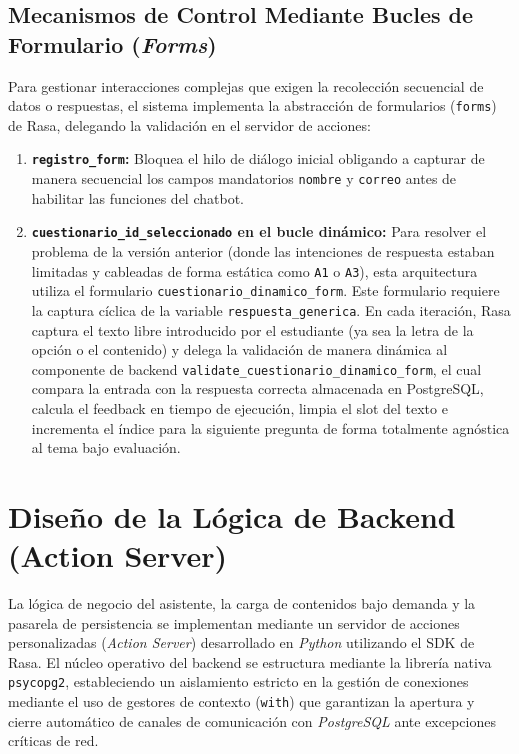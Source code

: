 \documentclass[a4paper,12pt,twoside,final]{book}
\begin{document}
\subsection{Mecanismos de Control Mediante Bucles de Formulario (\textit{Forms})}
Para gestionar interacciones complejas que exigen la recolección secuencial de datos o respuestas, el sistema implementa la abstracción de formularios (\texttt{forms}) de Rasa, delegando la validación en el servidor de acciones:
\begin{enumerate}
    \item \textbf{\texttt{registro\_form}:} Bloquea el hilo de diálogo inicial obligando a capturar de manera secuencial los campos mandatorios \texttt{nombre} y \texttt{correo} antes de habilitar las funciones del chatbot.
    \item \textbf{\texttt{cuestionario\_id\_seleccionado} en el bucle dinámico:} Para resolver el problema de la versión anterior (donde las intenciones de respuesta estaban limitadas y cableadas de forma estática como \texttt{A1} o \texttt{A3}), esta arquitectura utiliza el formulario \texttt{cuestionario\_dinamico\_form}. Este formulario requiere la captura cíclica de la variable \texttt{respuesta\_generica}. En cada iteración, Rasa captura el texto libre introducido por el estudiante (ya sea la letra de la opción o el contenido) y delega la validación de manera dinámica al componente de backend \texttt{validate\_cuestionario\_dinamico\_form}, el cual compara la entrada con la respuesta correcta almacenada en PostgreSQL, calcula el feedback en tiempo de ejecución, limpia el slot del texto e incrementa el índice para la siguiente pregunta de forma totalmente agnóstica al tema bajo evaluación.
\end{enumerate}

\newpage
\section{Diseño de la Lógica de Backend (Action Server)}
\label{sec:diseno_backend}

La lógica de negocio del asistente, la carga de contenidos bajo demanda y la pasarela de persistencia se implementan mediante un servidor de acciones personalizadas (\textit{Action Server}) desarrollado en \textit{Python} utilizando el SDK de Rasa. El núcleo operativo del backend se estructura mediante la librería nativa \texttt{psycopg2}, estableciendo un aislamiento estricto en la gestión de conexiones mediante el uso de gestores de contexto (\texttt{with}) que garantizan la apertura y cierre automático de canales de comunicación con \textit{PostgreSQL} ante excepciones críticas de red.\\
\end{document}
